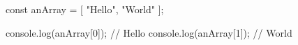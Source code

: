 const anArray = [
    "Hello",
    "World"
];

console.log(anArray[0]); // Hello
console.log(anArray[1]); // World

